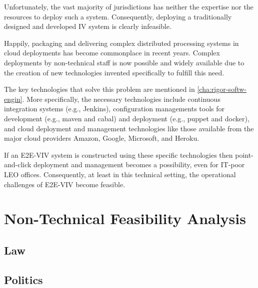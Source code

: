 Unfortunately, the vast majority of jurisdictions has neither the
expertise nor the resources to deploy such a system. Consequently,
deploying a traditionally designed and developed IV system is clearly
infeasible.

Happily, packaging and delivering complex distributed processing
systems in cloud deployments has become commonplace in recent years.
Complex deployments by non-technical staff is now possible and widely
available due to the creation of new technologies invented
specifically to fulfill this need. 

The key technologies that solve this problem are mentioned in
\autoref{cha:rigor-softw-engin}.  More specifically, the necessary
technologies include continuous integration systems (e.g., Jenkins),
configuration managements tools for development (e.g., maven and
cabal) and deployment (e.g., puppet and docker), and cloud deployment
and management technologies like those available from the major cloud
providers Amazon, Google, Microsoft, and Heroku.

If an E2E-VIV system is constructed using these specific technologies
then point-and-click deployment and management becomes a possibility,
even for IT-poor LEO offices.  Consequently, at least in this
technical setting, the operational challenges of E2E-VIV become
feasible.

\section{Non-Technical Feasibility Analysis}


\subsection{Law}


\subsection{Politics}


